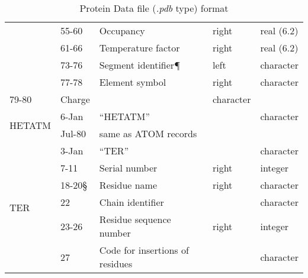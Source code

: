 \begin{table}[!ht]
\begin{tabular}{|l|l|l|l|l|}
                        & 55-60   & Occupancy                       & right         & real (6.2) \\ \cline{2-5} 
                        & 61-66   & Temperature factor              & right         & real (6.2) \\ \cline{2-5} 
                        & 73-76   & Segment identifier¶             & left          & character  \\ \cline{2-5} 
                        & 77-78   & Element symbol                  & right         & character  \\ \hline
79-80                   & Charge  &                                 & character     &            \\ \hline
\multirow{2}{*}{HETATM} & 6-Jan   & “HETATM”                        &               & character  \\ \cline{2-5} 
                        & Jul-80  & same as ATOM records            &               &            \\ \hline
\multirow{6}{*}{TER}    & 3-Jan   & “TER”                           &               & character  \\ \cline{2-5} 
                        & 7-11  & Serial number                   & right         & integer    \\ \cline{2-5} 
                        & 18-20§  & Residue name                    & right         & character  \\ \cline{2-5} 
                        & 22      & Chain identifier                &               & character  \\ \cline{2-5} 
                        & 23-26   & Residue sequence number         & right         & integer    \\ \cline{2-5} 
                        & 27      & Code for insertions of residues &               & character  \\ \hline
\end{tabular}
\caption{Protein Data file (\textit{.pdb} type) format}
\label{tab:PDB_format}
\end{table}
